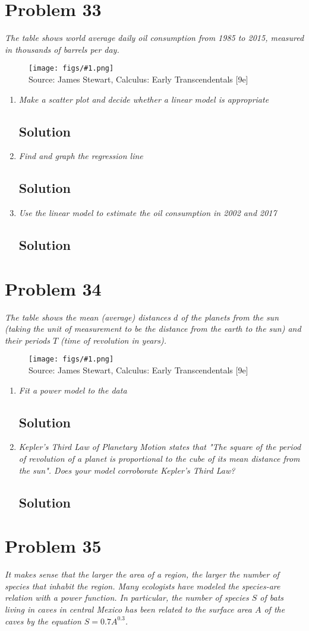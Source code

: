 \documentclass[11pt]{article}
\newcommand{\soln}{\subsection*}
\newcommand{\qn}{\textit}
\newcommand{\imagesource}[1]{{\footnotesize Source: #1}}
\newcommand{\imgqn}[1]{
	\begin{figure}[H]
		\centering
		\texttt{[image: figs/\#1.png]}\\
		\imagesource{James Stewart, Calculus: Early Transcendentals [9e]}
	\end{figure}
}
\begin{document}
\section*{Problem 33}

\qn{The table shows world average daily oil consumption from 1985 to 2015, measured in thousands of barrels per day.}

\imgqn{1.2.33}

\begin{enumerate}
	\item \qn{Make a scatter plot and decide whether a linear model is appropriate}
	\soln{Solution}
	
	\item \qn{Find and graph the regression line}
	\soln{Solution}
	
	\item \qn{Use the linear model to estimate the oil consumption in 2002 and 2017}
	\soln{Solution}
\end{enumerate}

\section*{Problem 34}

\qn{The table shows the mean (average) distances $d$ of the planets from the sun (taking the unit of measurement to be the distance from the earth to the sun) and their periods $T$ (time of revolution in years).}

\imgqn{1.2.34}

\begin{enumerate}
	\item \qn{Fit a power model to the data}
	\soln{Solution}
	
	\item \qn{Kepler's Third Law of Planetary Motion states that "The square of the period of revolution of a planet is proportional to the cube of its mean distance from the sun". Does your model corroborate Kepler's Third Law?}
	\soln{Solution}
\end{enumerate}

\section*{Problem 35}

\qn{It makes sense that the larger the area of a region, the larger the number of species that inhabit the region. Many ecologists have modeled the species-are relation with a power function. In particular, the number of species $S$ of bats living in caves in central Mexico has been related to the surface area $A$ of the caves by the equation $S=0.7A^{0.3}$.}
\end{document}

